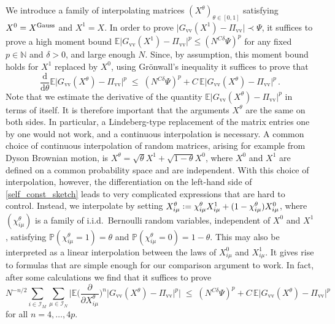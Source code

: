 \documentclass[11pt]{article} %
\numberwithin{equation}{section}
\numberwithin{figure}{section}
\theoremstyle{plain} %
\theoremstyle{definition} %
\newcommand{\f}[1]{\boldsymbol{\mathrm{#1}}} %
\renewcommand{\cal}{\mathcal}
\newcommand{\txt}[1]{\text{\rm{#1}}}
\renewcommand{\P}{\mathbb{P}}
\newcommand{\E}{\mathbb{E}}
\newcommand{\N}{\mathbb{N}}
\newcommand{\dd}{\mathrm{d}}
\newcommand*{\deq}{\mathrel{\vcenter{\baselineskip0.65ex \lineskiplimit0pt \hbox{.}\hbox{.}}}=}
\renewcommand{\leq}{\leqslant}
\newcommand{\pbb}[1]{\biggl({#1}\biggr)}
\newcommand{\abs}[1]{\lvert #1 \rvert}
\newcommand{\absb}[1]{\bigl\lvert #1 \bigr\rvert}
\newcommand{\absBB}[1]{\Biggl\lvert #1 \Biggr\rvert}
\begin{document}
We introduce a family of interpolating matrices $(X^\theta)_{\theta \in [0,1]}$ satisfying $X^0 = X^{\txt{Gauss}}$ and $X^1 = X$. In order to prove $\abs{G_{\f v \f v}(X^1) - \Pi_{\f v \f v}} \prec \Psi$, it suffices to prove a high moment bound $\E \absb{G_{\f v \f v}(X^1) - \Pi_{\f v \f v}}^p \leq (N^{C \delta} \Psi)^p$ for any fixed $p \in \N$ and $\delta > 0$, and large enough $N$. Since, by assumption, this moment bound holds for $X^1$ replaced by $X^0$, using Gr\"onwall's inequality it suffices to prove that
\begin{equation} \label{self_const_sketch}
\frac{\dd}{ \dd \theta} \E \absb{G_{\f v \f v}(X^\theta) - \Pi_{\f v \f v}}^p \;\leq\; (N^{C \delta} \Psi)^p + C \, \E \absb{G_{\f v \f v}(X^\theta) - \Pi_{\f v \f v}}^p\,.
\end{equation}
Note that we estimate the derivative of the quantity $\E \absb{G_{\f v \f v}(X^\theta) - \Pi_{\f v \f v}}^p$ in terms of itself. It is therefore  important that the arguments $X^\theta$ are the same on both sides. In particular, a Lindeberg-type replacement of the matrix entries one by one would not work, and a continuous interpolation is necessary.  A common choice of continuous interpolation of random matrices, arising for example from Dyson Brownian motion, is $X^\theta = \sqrt{\theta} X^1 + \sqrt{1 - \theta} X^0$, where $X^0$ and $X^1$ are defined on a common probability space and are independent. With this choice of interpolation, however, the differentiation on the left-hand side of \eqref{self_const_sketch} leads to very complicated expressions that are hard to control. Instead, we interpolate by setting
$X^\theta_{i \mu} \deq \chi^\theta_{i\mu} X^1_{i \mu} + (1 - \chi^\theta_{i \mu}) X^0_{i \mu}$,
where $(\chi^\theta_{i \mu})$ is a family of i.i.d.\ Bernoulli random variables, independent of $X^0$ and $X^1$, satisfying $\P(\chi^\theta_{i \mu} = 1) = \theta$ and $\P(\chi^\theta_{i \mu} = 0) = 1 - \theta$. This may also be interpreted as a linear interpolation between the laws of $X^0_{i \mu}$ and $X^1_{i \mu}$. It gives rise to formulas that are simple enough for our comparison argument to work. In fact, after some calculations we find that it suffices to prove
\begin{equation} \label{sketch_main_est}
N^{-n/2} \sum_{i \in \cal I_M} \sum_{\mu \in \cal I_N} \absBB{\E \pbb{\frac{\partial}{\partial X^\theta_{i \mu}}}^n \absb{G_{\f v \f v}(X^\theta) - \Pi_{\f v \f v}}^p} \;\leq\; (N^{C \delta} \Psi)^p + C \, \E \absb{G_{\f v \f v}(X^\theta) - \Pi_{\f v \f v}}^p
\end{equation}
for all $n = 4, \dots, 4p$.
\end{document}
